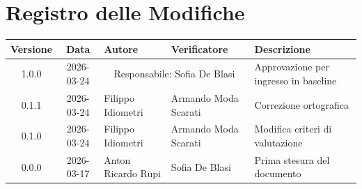 \section*{Registro delle Modifiche}
\begin{table}[ht]
	\centering
	\renewcommand{\arraystretch}{1.5}
	\begin{tabularx}{\textwidth}{c c l l X}
		\toprule
		\textbf{Versione} & \textbf{Data} & \textbf{Autore} & \textbf{Verificatore} & \textbf{Descrizione} \\
		\midrule
		1.0.0 & 2026-03-24 & \multicolumn{2}{c}{Responsabile: Sofia De Blasi} & Approvazione \newline per ingresso in \newline baseline \\
		0.1.1 & 2026-03-24 & Filippo Idiometri & Armando Moda Scarati & Correzione \newline ortografica \\
		0.1.0 & 2026-03-24 & Filippo Idiometri & Armando Moda Scarati & Modifica criteri di valutazione \\
		0.0.0 & 2026-03-17 & Anton Ricardo Rupi & Sofia De Blasi & Prima stesura del documento \\
		\bottomrule
	\end{tabularx}
\end{table}
